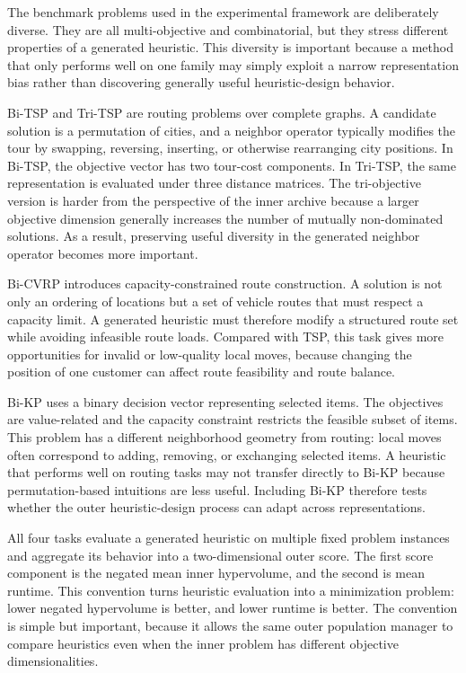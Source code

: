 The benchmark problems used in the experimental framework are deliberately diverse. They are all multi-objective and combinatorial, but they stress different properties of a generated heuristic. This diversity is important because a method that only performs well on one family may simply exploit a narrow representation bias rather than discovering generally useful heuristic-design behavior.

Bi-TSP and Tri-TSP are routing problems over complete graphs. A candidate solution is a permutation of cities, and a neighbor operator typically modifies the tour by swapping, reversing, inserting, or otherwise rearranging city positions. In Bi-TSP, the objective vector has two tour-cost components. In Tri-TSP, the same representation is evaluated under three distance matrices. The tri-objective version is harder from the perspective of the inner archive because a larger objective dimension generally increases the number of mutually non-dominated solutions. As a result, preserving useful diversity in the generated neighbor operator becomes more important.

Bi-CVRP introduces capacity-constrained route construction. A solution is not only an ordering of locations but a set of vehicle routes that must respect a capacity limit. A generated heuristic must therefore modify a structured route set while avoiding infeasible route loads. Compared with TSP, this task gives more opportunities for invalid or low-quality local moves, because changing the position of one customer can affect route feasibility and route balance.

Bi-KP uses a binary decision vector representing selected items. The objectives are value-related and the capacity constraint restricts the feasible subset of items. This problem has a different neighborhood geometry from routing: local moves often correspond to adding, removing, or exchanging selected items. A heuristic that performs well on routing tasks may not transfer directly to Bi-KP because permutation-based intuitions are less useful. Including Bi-KP therefore tests whether the outer heuristic-design process can adapt across representations.

All four tasks evaluate a generated heuristic on multiple fixed problem instances and aggregate its behavior into a two-dimensional outer score. The first score component is the negated mean inner hypervolume, and the second is mean runtime. This convention turns heuristic evaluation into a minimization problem: lower negated hypervolume is better, and lower runtime is better. The convention is simple but important, because it allows the same outer population manager to compare heuristics even when the inner problem has different objective dimensionalities.


